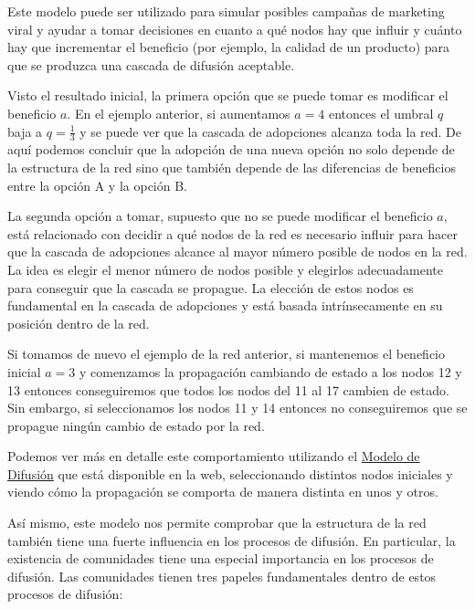 \documentclass[]{article}
\begin{document}
Este modelo puede ser utilizado para simular posibles campañas de
marketing viral y ayudar a tomar decisiones en cuanto a qué nodos hay
que influir y cuánto hay que incrementar el beneficio (por ejemplo, la
calidad de un producto) para que se produzca una cascada de difusión
aceptable.

Visto el resultado inicial, la primera opción que se puede tomar es
modificar el beneficio \(a\). En el ejemplo anterior, si aumentamos
\(a =4\) entonces el umbral \(q\) baja a \(q=\frac{1}{3}\) y se puede
ver que la cascada de adopciones alcanza toda la red. De aquí podemos
concluir que la adopción de una nueva opción no solo depende de la
estructura de la red sino que también depende de las diferencias de
beneficios entre la opción A y la opción B.

La segunda opción a tomar, supuesto que no se puede modificar el
beneficio \(a\), está relacionado con decidir a qué nodos de la red es
necesario influir para hacer que la cascada de adopciones alcance al
mayor número posible de nodos en la red. La idea es elegir el menor
número de nodos posible y elegirlos adecuadamente para conseguir que la
cascada se propague. La elección de estos nodos es fundamental en la
cascada de adopciones y está basada intrínsecamente en su posición
dentro de la red.

Si tomamos de nuevo el ejemplo de la red anterior, si mantenemos el
beneficio inicial \(a=3\) y comenzamos la propagación cambiando de
estado a los nodos 12 y 13 entonces conseguiremos que todos los nodos
del 11 al 17 cambien de estado. Sin embargo, si seleccionamos los nodos
11 y 14 entonces no conseguiremos que se propague ningún cambio de
estado por la red.

Podemos ver más en detalle este comportamiento utilizando el
\href{http://www.ladamic.com/netlearn/NetLogo4/DiffusionCompetition.html}{Modelo
de Difusión} que está disponible en la web, seleccionando distintos
nodos iniciales y viendo cómo la propagación se comporta de manera
distinta en unos y otros.

Así mismo, este modelo nos permite comprobar que la estructura de la red
también tiene una fuerte influencia en los procesos de difusión. En
particular, la existencia de comunidades tiene una especial importancia
en los procesos de difusión. Las comunidades tienen tres papeles
fundamentales dentro de estos procesos de difusión:
\end{document}
